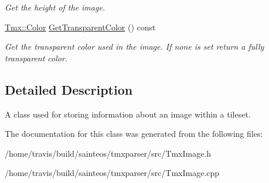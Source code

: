 \begin{DoxyCompactItemize}
\begin{DoxyCompactList}\small\item\em Get the height of the image. \end{DoxyCompactList}\item 
\hypertarget{classTmx_1_1Image_ab1fa4a19a0cf59a91a43a798e279de96}{\hyperlink{classTmx_1_1Color}{Tmx\-::\-Color} \hyperlink{classTmx_1_1Image_ab1fa4a19a0cf59a91a43a798e279de96}{Get\-Transparent\-Color} () const }\label{classTmx_1_1Image_ab1fa4a19a0cf59a91a43a798e279de96}

\begin{DoxyCompactList}\small\item\em Get the transparent color used in the image. If none is set return a fully transparent color. \end{DoxyCompactList}\end{DoxyCompactItemize}


\subsection{Detailed Description}
A class used for storing information about an image within a tileset. 

The documentation for this class was generated from the following files\-:\begin{DoxyCompactItemize}
\item 
/home/travis/build/sainteos/tmxparser/src/Tmx\-Image.\-h\item 
/home/travis/build/sainteos/tmxparser/src/Tmx\-Image.\-cpp\end{DoxyCompactItemize}
